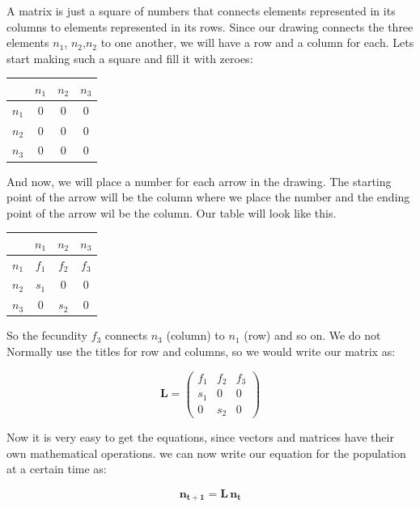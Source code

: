 \documentclass[12pt]{article}
\begin{document}
A matrix is just a square of numbers that connects elements represented in its columns to elements represented in its rows. Since our drawing connects the three elements $n_1$, $n_2$,$n_2$ to one another, we will have a row and a column for each. Lets start making such a square and fill it with zeroes:

\begin{center}
\begin{tabular}{c|ccc}
	& $n_1$ & $n_2$ & $n_3$ \\
	\hline 
	$n_1$ &0	&0	&0	\\
	$n_2$ &0	&0	&0	\\
	$n_3$ &0	&0	&0	\\
\end{tabular}
\end{center}

And now, we will place a number for each arrow in the drawing. The starting point of the arrow will be the column where we place the number and the ending point of the arrow wil be the column. Our table will look like this.

\begin{center}
	\begin{tabular}{c|ccc}
		& $n_1$ & $n_2$ & $n_3$ \\
		\hline
		$n_1$ &$f_1$	&$f_2$	&$f_3$	\\
		$n_2$ &$s_1$	&0	&0	\\
		$n_3$ &0	&$s_2$	&0	\\
	\end{tabular}
\end{center}

So the fecundity $f_3$ connects $n_3$ (column) to $n_1$ (row) and so on. We do not Normally use the titles for row and columns, so we would write our matrix as:

\begin{equation}
\mathbf{L} =	\begin{pmatrix}
		f_1	&f_2	&f_3	\\
		s_1	&0	&0	\\
		0	&s_2	&0
	\end{pmatrix}
\end{equation}

Now it is very easy to get the equations, since vectors and matrices have their own mathematical operations. we can now write our equation for the population at a certain time as:

\begin{equation}
	\mathbf{n_{t+1}} =\mathbf{L} \, \mathbf{n_t}
	\label{fig:matequationL}
\end{equation}
\end{document}
